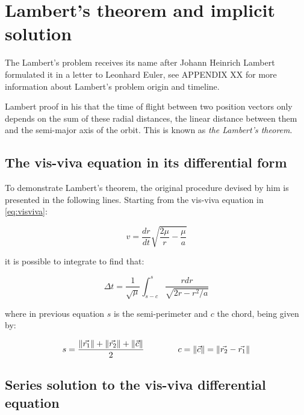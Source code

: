 \section{Lambert's theorem and implicit solution}
\label{sec:lamberts_theorem}

The Lambert's problem receives its name after Johann Heinrich Lambert formulated
it in a letter to Leonhard Euler, see APPENDIX XX for more information about
Lambert's problem origin and timeline.

Lambert proof in his  that the time of flight between two
position vectors only depends on the sum of these radial distances, the linear
distance between them and the semi-major axis of the orbit. This is known as
\textit{the Lambert's theorem}.

\subsection{The vis-viva equation in its differential form}

To demonstrate Lambert's theorem, the original procedure devised by him is
presented in the following lines. Starting from the vis-viva equation in
\ref{eq:visviva}:

\begin{equation}
  v = \frac{dr}{dt} \sqrt{\frac{2\mu}{r} - \frac{\mu}{a}}
  \label{eq:visviva}
\end{equation}

it is possible to integrate to find that:

\begin{equation}
  \Delta t = \frac{1}{\sqrt{\mu}} \int_{s-c}^{s} \frac{r dr}{\sqrt{2r -
      r^{2}/a}}
  \label{eq:visviva_integral}
\end{equation}

where in previous equation $s$ is the semi-perimeter and $c$ the chord, being
given by:

\begin{equation}
  s = \frac{\lVert\vec{r_{1}}\rVert + \lVert\vec{r_{2}}\rVert +
    \lVert\vec{c}\rVert}{2}\quad\quad\quad\quad
  c = \lVert\vec{c}\rVert = \lVert\vec{r_{2}} - \vec{r_{1}}\rVert
  \label{eq:s_and_c_lambert}
\end{equation}

\subsection{Series solution to the vis-viva differential equation}

